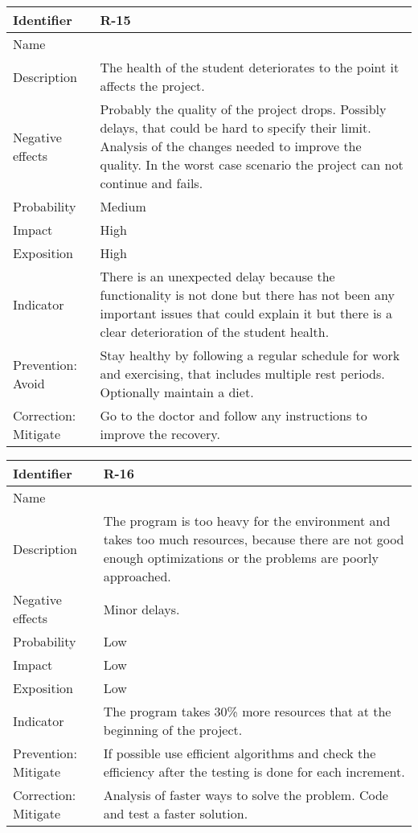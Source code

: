 \begin{table}[H]
	\begin{tabularx}{\textwidth}{|y|z|}
		\hline
		Identifier & \textbf{R-15} \\ \hline
		Name & \Rquince \\ \hline
		Description &
			The health of the student deteriorates to the point it affects the project.
		\\ \hline
		Negative effects &
			Probably the quality of the project drops. \linej
			Possibly delays, that could be hard to specify their limit. \linej
			Analysis of the changes needed to improve the quality. \linej
			In the worst case scenario the project can not continue and fails.
		\\ \hline
		Probability & Medium\\ \hline
		Impact &  High\\ \hline
		Exposition &  High\\ \hline
		Indicator & There is an unexpected delay because the functionality is not done but there has not been any important issues that could explain it but there is a clear deterioration of the student health. \\ \hline
		Prevention: Avoid &
			Stay healthy by following a regular schedule for work and exercising, that includes multiple rest periods. \linej
			Optionally maintain a diet.
		\\ \hline
		Correction: Mitigate &
			Go to the doctor and follow any instructions to improve the recovery.
		\\ \hline
	\end{tabularx}
\end{table}

\begin{table}[H]
	\begin{tabularx}{\textwidth}{|y|z|}
		\hline
		Identifier & \textbf{R-16} \\ \hline
		Name & \Rdieciseis \\ \hline
		Description &
			The program is too heavy for the environment and takes too much resources, because there are not good enough optimizations or the problems are poorly approached.
		\\ \hline
		Negative effects &
			Minor delays. \linej
		\\ \hline
		Probability & Low\\ \hline
		Impact &  Low\\ \hline
		Exposition &  Low\\ \hline
		Indicator & The program takes 30\% more resources that at the beginning of the project.\\ \hline
		Prevention: Mitigate &
			If possible use efficient algorithms and check the efficiency after the testing is done for each increment.
		\\ \hline
		Correction: Mitigate &
			Analysis of faster ways to solve the problem.\linej
			Code and test a faster solution.
		\\ \hline
	\end{tabularx}
\end{table}

